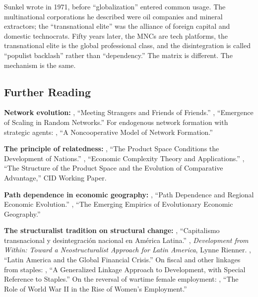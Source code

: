 \documentclass[../structural_economics_book.tex]{subfiles}
\begin{document}
Sunkel wrote in 1971, before ``globalization'' entered common usage. The multinational corporations he described were oil companies and mineral extractors; the ``transnational elite'' was the alliance of foreign capital and domestic technocrats. Fifty years later, the MNCs are tech platforms, the transnational elite is the global professional class, and the disintegration is called ``populist backlash'' rather than ``dependency.'' The matrix is different. The mechanism is the same.


\subsection*{Further Reading}

\textbf{Network evolution:} \citet{jackson2007meeting}, ``Meeting Strangers and Friends of Friends.'' \citet{barabasi1999emergence}, ``Emergence of Scaling in Random Networks.'' For endogenous network formation with strategic agents: \citet{bala2000noncooperative}, ``A Noncooperative Model of Network Formation.''

\textbf{The principle of relatedness:} \citet{hidalgo2007product}, ``The Product Space Conditions the Development of Nations.'' \citet{hidalgo2021economic}, ``Economic Complexity Theory and Applications.'' \citet{hausmann2007structure}, ``The Structure of the Product Space and the Evolution of Comparative Advantage,'' CID Working Paper.

\textbf{Path dependence in economic geography:} \citet{martin2006path}, ``Path Dependence and Regional Economic Evolution.'' \citet{boschma2011emerging}, ``The Emerging Empirics of Evolutionary Economic Geography.''

\textbf{The structuralist tradition on structural change:} \citet{sunkel1971capitalismo}, ``Capitalismo transnacional y desintegraci\'{o}n nacional en Am\'{e}rica Latina.'' \citet{sunkel1993development}, \textit{Development from Within: Toward a Neostructuralist Approach for Latin America}, Lynne Rienner. \citet{ocampo2009latin}, ``Latin America and the Global Financial Crisis.'' On fiscal and other linkages from staples: \citet{hirschman1977generalized}, ``A Generalized Linkage Approach to Development, with Special Reference to Staples.'' On the reversal of wartime female employment: \citet{goldin1991role}, ``The Role of World War II in the Rise of Women's Employment.''
\end{document}
